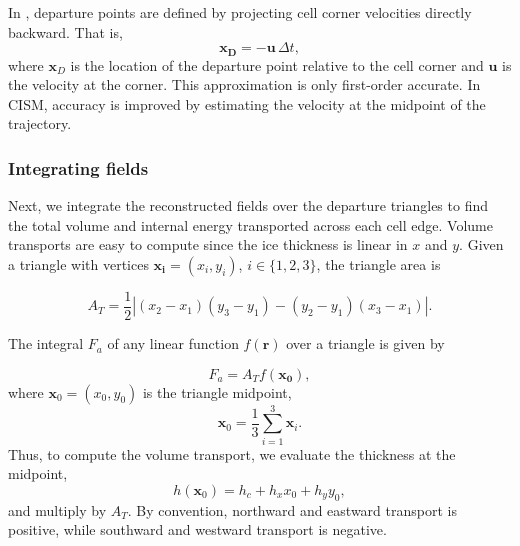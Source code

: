 
In \citet{Dukowicz2000}, departure points are defined by projecting cell
corner velocities directly backward.  That is,
\begin{equation}
  \label{gliss.eq.IR_departure_points} 
  \mathbf{x_D} = -\mathbf{u} \, \Delta t,
\end{equation}
where $\mathbf{x}_D$ is the location of the departure point
relative to the cell corner and $\mathbf{u}$ is the velocity at the corner. 
This approximation is only first-order accurate. In CISM, accuracy is improved 
by estimating the velocity at the midpoint of the trajectory.

\subsubsection{Integrating fields}
\label{sc:glissade-IR-integrate}

Next, we integrate the reconstructed fields over the departure
triangles to find the total volume and internal energy transported
across each cell edge.  Volume transports are easy to compute since the
ice thickness is linear in $x$ and $y$.  Given a triangle with vertices
$\mathbf{x_i} = (x_i,y_i)$, $i\in\{1,2,3\}$, the triangle area is

\begin{equation}
  A_T = \frac{1}{2}\left|(x_2-x_1)(y_3-y_1) - (y_2-y_1)(x_3-x_1)\right|.
\end{equation}

\noindent
The integral $F_a$ of any linear function $f(\mathbf{r})$ over a triangle is given by

\begin{equation}
  \label{gliss.eq.IR_integrate1}
  F_a = A_T f(\mathbf{x_0}),
\end{equation}
where $\mathbf{x}_0 = (x_0,y_0)$ is the triangle midpoint,
\begin{equation}
  \mathbf{x}_0 = \frac{1}{3} \sum_{i=1}^3\mathbf{x}_i.
\end{equation}
Thus, to compute the volume transport, we evaluate the thickness at the midpoint,
\begin{equation}
  h(\mathbf{x}_0)  = h_c + h_x x_0 + h_y y_0,
\end{equation}
and multiply by $A_T$.  By convention, northward and eastward
transport is positive, while southward and westward transport is
negative.

